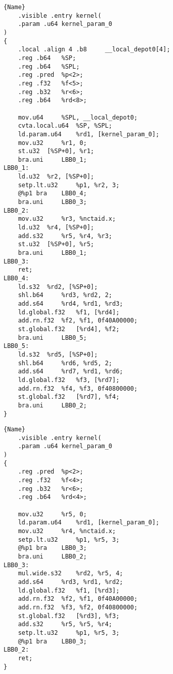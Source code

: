 \begin{figure}
  \hspace*{-.12\textwidth}%
  \begin{minipage}{0.6\textwidth}
    \centering
    \begin{lstlisting}[caption=code 2,frame=tlrb]{Name}
	.visible .entry kernel(
	.param .u64 kernel_param_0
)
{
	.local .align 4 .b8 	__local_depot0[4];
	.reg .b64 	%SP;
	.reg .b64 	%SPL;
	.reg .pred 	%p<2>;
	.reg .f32 	%f<5>;
	.reg .b32 	%r<6>;
	.reg .b64 	%rd<8>;

	mov.u64 	%SPL, __local_depot0;
	cvta.local.u64 	%SP, %SPL;
	ld.param.u64 	%rd1, [kernel_param_0];
	mov.u32 	%r1, 0;
	st.u32 	[%SP+0], %r1;
	bra.uni 	LBB0_1;
LBB0_1:
	ld.u32 	%r2, [%SP+0];
	setp.lt.u32 	%p1, %r2, 3;
	@%p1 bra 	LBB0_4;
	bra.uni 	LBB0_3;
LBB0_2:
	mov.u32 	%r3, %nctaid.x;
	ld.u32 	%r4, [%SP+0];
	add.s32 	%r5, %r4, %r3;
	st.u32 	[%SP+0], %r5;
	bra.uni 	LBB0_1;
LBB0_3:
	ret;
LBB0_4:
	ld.s32 	%rd2, [%SP+0];
	shl.b64 	%rd3, %rd2, 2;
	add.s64 	%rd4, %rd1, %rd3;
	ld.global.f32 	%f1, [%rd4];
	add.rn.f32 	%f2, %f1, 0f40A00000;
	st.global.f32 	[%rd4], %f2;
	bra.uni 	LBB0_5;
LBB0_5:
	ld.s32 	%rd5, [%SP+0];
	shl.b64 	%rd6, %rd5, 2;
	add.s64 	%rd7, %rd1, %rd6;
	ld.global.f32 	%f3, [%rd7];
	add.rn.f32 	%f4, %f3, 0f40800000;
	st.global.f32 	[%rd7], %f4;
	bra.uni 	LBB0_2;
}
	\end{lstlisting}
  \end{minipage}%
  \qquad
  \quad
  \begin{minipage}{0.6\textwidth}
    \centering
	\begin{lstlisting}[caption=code 2,frame=tlrb, firstnumber=1]{Name}
	.visible .entry kernel(
	.param .u64 kernel_param_0
)
{
	.reg .pred 	%p<2>;
	.reg .f32 	%f<4>;
	.reg .b32 	%r<6>;
	.reg .b64 	%rd<4>;

	mov.u32 	%r5, 0;
	ld.param.u64 	%rd1, [kernel_param_0];
	mov.u32 	%r4, %nctaid.x;
	setp.lt.u32 	%p1, %r5, 3;
	@%p1 bra 	LBB0_3;
	bra.uni 	LBB0_2;
LBB0_3:
	mul.wide.s32 	%rd2, %r5, 4;
	add.s64 	%rd3, %rd1, %rd2;
	ld.global.f32 	%f1, [%rd3];
	add.rn.f32 	%f2, %f1, 0f40A00000;
	add.rn.f32 	%f3, %f2, 0f40800000;
	st.global.f32 	[%rd3], %f3;
	add.s32 	%r5, %r5, %r4;
	setp.lt.u32 	%p1, %r5, 3;
	@%p1 bra 	LBB0_3;
LBB0_2:
	ret;
}
	\end{lstlisting}
  \end{minipage}%
  \hspace*{-.1\textwidth}%
\end{figure}
